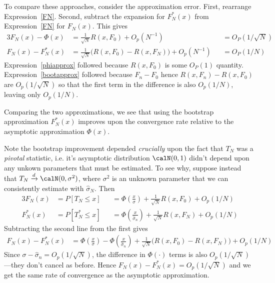 \documentclass[12pt]{article}
\theoremstyle{plain}
\theoremstyle{definition}
\theoremstyle{remark}
\newcommand{\dto}{\xrightarrow{d}}
\begin{document}
To compare these approaches, consider the approximation error.
First, rearrange Expression~\ref{FN}. Second, subtract the expansion for
$F_N^*(x)$ from Expression~\ref{FN} for $F_N(x)$.
This gives
\begin{alignat}{3}
  F_N(x)
  -
  \Phi(x)
  &=
  \frac{1}{\sqrt{N}}
  R(x,F_0)
  +
  O_p(N^{-1})
  &&=
  O_P(1/\sqrt{N})
  \label{phiapprox}
  \\
  F_N(x)
  - F_N^*(x)
  &=
  \frac{1}{\sqrt{N}}
  \big(
  R(x,F_0)
  -
  R(x,F_N)
  \big)
  +
  O_p(N^{-1})
  &&=
  O_P(1/N)
  \label{bootapprox}
\end{alignat}
Expression~\ref{phiapprox} followed because $R(x,F_0)$ is some $O_P(1)$
quantity.
Expression~\ref{bootapprox} followed because $F_n-F_0$ hence
$R(x,F_n)-R(x,F_0)$ are $O_p(1/\sqrt{N})$ so that the first term
in the difference is also $O_p(1/N)$, leaving only $O_p(1/N)$.

Comparing the two approximations, we see that using the bootstrap
approximation $F_N^*(x)$ improves upon the convergence rate relative to
the asymptotic approximation $\Phi(x)$.

Note the bootstrap improvement depended \emph{crucially} upon the fact
that $T_N$ was a \emph{pivotal} statistic, i.e. it's asymptotic
distribution $\calN(0,1)$ didn't depend upon any unkown parameters that
must be estimated.
To see why, suppose instead that $T_N\dto \calN(0,\sigma^2)$, where
$\sigma^2$ is an unknown parameter that we can consistently estimate
with $\hat{\sigma}_N$.
Then
\begin{alignat*}{3}
  F_N(x)
  &=
  P[T_N\leq x]
  &&=
  \Phi\left(
  \frac{x}{\sigma}
  \right)
  +
  \frac{1}{\sqrt{N}}
  R(x,F_0)
  +
  O_p(1/N)
  \\
  F_N^*(x)
  &=
  P[T_N^*\leq x]
  &&=
  \Phi\left(
  \frac{x}{\hat{\sigma}_n}
  \right)
  +
  \frac{1}{\sqrt{N}}
  R(x,F_N)
  +
  O_p(1/N)
\end{alignat*}
Subtracting the second line from the first gives
\begin{align*}
  F_N(x)
  - F_N^*(x)
  &=
  \Phi\left(
  \frac{x}{\sigma}
  \right)
  -
  \Phi\left(
  \frac{x}{\hat{\sigma}_n}
  \right)
  +
  \frac{1}{\sqrt{N}}
  \big(
  R(x,F_0)
  - R(x,F_N)
  \big)
  +
  O_p(1/N)
\end{align*}
Since $\sigma-\hat{\sigma}_n=O_p(1/\sqrt{N})$, the difference in
$\Phi(\cdot)$ terms is also $O_p(1/\sqrt{N})$---they don't cancel as
before. Hence $F_N(x)-F_N^*(x)=O_p(1/\sqrt{N})$ and we get the same rate
of convergence as the asymptotic approximation.
\end{document}
